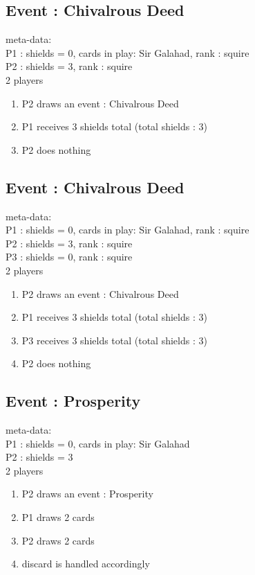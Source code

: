 \documentclass[a4paper,11pt]{article}
\begin{document}
\subsection{Event : Chivalrous Deed}
meta-data:\\
P1 : shields = 0, cards in play: Sir Galahad, rank : squire\\
P2 : shields = 3, rank : squire \\
2 players\\
\begin{enumerate}
	\item P2 draws an event : Chivalrous Deed
	\item P1 receives 3 shields total (total shields : 3)
	\item P2 does nothing
\end{enumerate}


\subsection{Event : Chivalrous Deed}
meta-data:\\
P1 : shields = 0, cards in play: Sir Galahad, rank : squire\\
P2 : shields = 3, rank : squire\\
P3 : shields = 0, rank : squire\\
2 players\\
\begin{enumerate}
	\item P2 draws an event : Chivalrous Deed
	\item P1 receives 3 shields total (total shields : 3)
	\item P3 receives 3 shields total (total shields : 3)
	\item P2 does nothing
\end{enumerate}


\subsection{Event : Prosperity}
meta-data:\\
P1 : shields = 0, cards in play: Sir Galahad\\
P2 : shields = 3\\
2 players\\
\begin{enumerate}
	\item P2 draws an event : Prosperity 
	\item P1 draws 2 cards
	\item P2 draws 2 cards
	\item discard is handled accordingly 
\end{enumerate}
\end{document}
